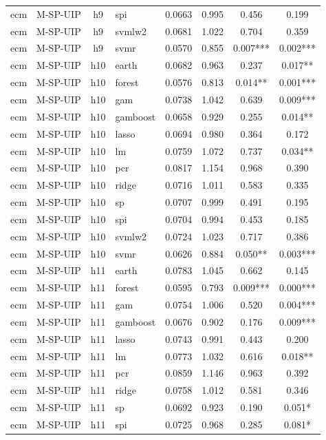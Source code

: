 \begin{ThreePartTable}
\begin{longtable}[t]{llclcccc}
ecm & M-SP-UIP & h9 & spi & 0.0663 & 0.995 & 0.456 & 0.199\\
ecm & M-SP-UIP & h9 & svmlw2 & 0.0681 & 1.022 & 0.704 & 0.359\\
ecm & M-SP-UIP & h9 & svmr & 0.0570 & 0.855 & 0.007*** & 0.002***\\
\addlinespace
ecm & M-SP-UIP & h10 & earth & 0.0682 & 0.963 & 0.237 & 0.017**\\
ecm & M-SP-UIP & h10 & forest & 0.0576 & 0.813 & 0.014** & 0.001***\\
ecm & M-SP-UIP & h10 & gam & 0.0738 & 1.042 & 0.639 & 0.009***\\
ecm & M-SP-UIP & h10 & gamboost & 0.0658 & 0.929 & 0.255 & 0.014**\\
ecm & M-SP-UIP & h10 & lasso & 0.0694 & 0.980 & 0.364 & 0.172\\
ecm & M-SP-UIP & h10 & lm & 0.0759 & 1.072 & 0.737 & 0.034**\\
ecm & M-SP-UIP & h10 & pcr & 0.0817 & 1.154 & 0.968 & 0.390\\
ecm & M-SP-UIP & h10 & ridge & 0.0716 & 1.011 & 0.583 & 0.335\\
ecm & M-SP-UIP & h10 & sp & 0.0707 & 0.999 & 0.491 & 0.195\\
ecm & M-SP-UIP & h10 & spi & 0.0704 & 0.994 & 0.453 & 0.185\\
ecm & M-SP-UIP & h10 & svmlw2 & 0.0724 & 1.023 & 0.717 & 0.386\\
ecm & M-SP-UIP & h10 & svmr & 0.0626 & 0.884 & 0.050** & 0.003***\\
\addlinespace
ecm & M-SP-UIP & h11 & earth & 0.0783 & 1.045 & 0.662 & 0.145\\
ecm & M-SP-UIP & h11 & forest & 0.0595 & 0.793 & 0.009*** & 0.000***\\
ecm & M-SP-UIP & h11 & gam & 0.0754 & 1.006 & 0.520 & 0.004***\\
ecm & M-SP-UIP & h11 & gamboost & 0.0676 & 0.902 & 0.176 & 0.009***\\
ecm & M-SP-UIP & h11 & lasso & 0.0743 & 0.991 & 0.443 & 0.200\\
ecm & M-SP-UIP & h11 & lm & 0.0773 & 1.032 & 0.616 & 0.018**\\
ecm & M-SP-UIP & h11 & pcr & 0.0859 & 1.146 & 0.963 & 0.392\\
ecm & M-SP-UIP & h11 & ridge & 0.0758 & 1.012 & 0.581 & 0.346\\
ecm & M-SP-UIP & h11 & sp & 0.0692 & 0.923 & 0.190 & 0.051*\\
ecm & M-SP-UIP & h11 & spi & 0.0725 & 0.968 & 0.285 & 0.081*\\

\end{longtable}
\end{ThreePartTable}
